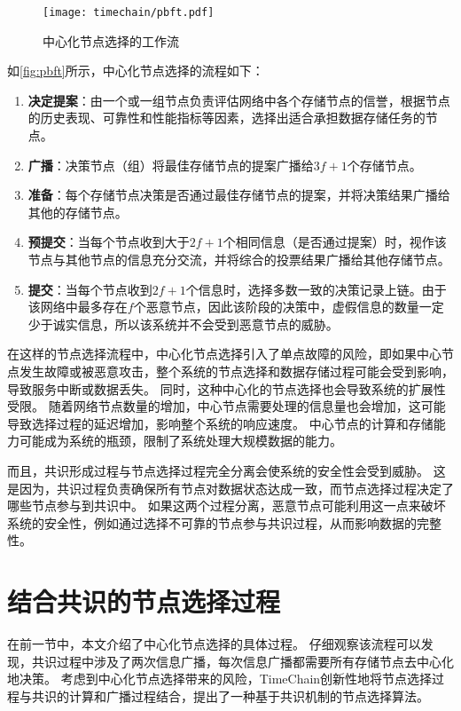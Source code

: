 \begin{figure}[t]
    \centering
    \texttt{[image: timechain/pbft.pdf]}
    \caption{中心化节点选择的工作流}
    \label{fig:pbft}
\end{figure}

如\autoref{fig:pbft}所示，中心化节点选择的流程如下：
\begin{enumerate}
    \item \textbf{决定提案}：由一个或一组节点负责评估网络中各个存储节点的信誉，根据节点的历史表现、可靠性和性能指标等因素，选择出适合承担数据存储任务的节点。
    \item \textbf{广播}：决策节点（组）将最佳存储节点的提案广播给$3f+1$个存储节点。
    \item \textbf{准备}：每个存储节点决策是否通过最佳存储节点的提案，并将决策结果广播给其他的存储节点。
    \item \textbf{预提交}：当每个节点收到大于$2f+1$个相同信息（是否通过提案）时，视作该节点与其他节点的信息充分交流，并将综合的投票结果广播给其他存储节点。
    \item \textbf{提交}：当每个节点收到$2f+1$个信息时，选择多数一致的决策记录上链。由于该网络中最多存在$f$个恶意节点，因此该阶段的决策中，虚假信息的数量一定少于诚实信息，所以该系统并不会受到恶意节点的威胁。
\end{enumerate}

在这样的节点选择流程中，中心化节点选择引入了单点故障的风险，即如果中心节点发生故障或被恶意攻击，整个系统的节点选择和数据存储过程可能会受到影响，导致服务中断或数据丢失。
同时，这种中心化的节点选择也会导致系统的扩展性受限。
随着网络节点数量的增加，中心节点需要处理的信息量也会增加，这可能导致选择过程的延迟增加，影响整个系统的响应速度。
中心节点的计算和存储能力可能成为系统的瓶颈，限制了系统处理大规模数据的能力。

而且，共识形成过程与节点选择过程完全分离会使系统的安全性会受到威胁。
这是因为，共识过程负责确保所有节点对数据状态达成一致，而节点选择过程决定了哪些节点参与到共识中。
如果这两个过程分离，恶意节点可能利用这一点来破坏系统的安全性，例如通过选择不可靠的节点参与共识过程，从而影响数据的完整性。

\section{结合共识的节点选择过程}

在前一节中，本文介绍了中心化节点选择的具体过程。
仔细观察该流程可以发现，共识过程中涉及了两次信息广播，每次信息广播都需要所有存储节点去中心化地决策。
考虑到中心化节点选择带来的风险，TimeChain创新性地将节点选择过程与共识的计算和广播过程结合，提出了一种基于共识机制的节点选择算法。


